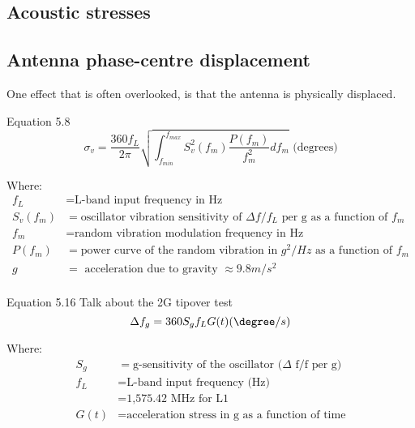 \subsection{Acoustic stresses}


\subsection{Antenna phase-centre displacement}
One effect that is often overlooked, is that the antenna is physically displaced.


Equation 5.8
\begin{equation}
\sigma_v = \frac{360f_L}{2\pi}\sqrt{\int_{f_{min}}^{f_{max}} S^2_v(f_m) \frac{P(f_m)}{f^2_m} df_m}\text{ (degrees)}
\end{equation}

Where:
\begin{align*}
f_L &= \text{L-band input frequency in Hz} \\
S_v(f_m) &= \text{oscillator vibration sensitivity of } \Delta f/f_L \text{ per g as a function of } f_m \\
f_m &= \text{random vibration modulation frequency in Hz} \\
P(f_m) &= \text{power curve of the random vibration in } g^2/Hz \text{ as a function of } f_m \\
g &= \text{ acceleration due to gravity } \approx 9.8 m/s^2\\
\end{align*}


Equation 5.16
Talk about the 2G tipover test
\begin{equation}
\Delta f_g = 360 S_g f_L G(t) (\degree/s)
\end{equation}

Where:
\begin{align*}
S_g &= \text{g-sensitivity of the oscillator } (\Delta \text{ f/f per g)}\\ 
f_L &= \text{L-band input frequency (Hz)}\\
&= \text{1,575.42 MHz for L1}\\
G(t) &= \text{acceleration stress in g as a function of time}
\end{align*}


